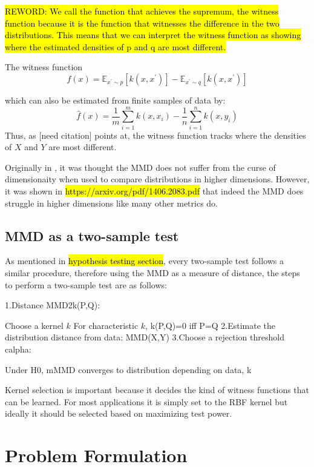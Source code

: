 \hl{REWORD: We call the function that achieves the supremum, the witness function because it is the function that witnesses the difference in the two distributions. This means that we can interpret the witness function as showing where the estimated densities of
p and q are most different.}

The witness function 
\begin{equation}
f(x)=\mathbb{E}_{x^{\prime} \sim p}\left[k\left(x, x^{\prime}\right)\right]-\mathbb{E}_{x^{\prime} \sim q}\left[k\left(x, x^{\prime}\right)\right]
\end{equation}

which can also be estimated from finite samples of data by:
\begin{equation}
\hat{f}(x)=\frac{1}{m} \sum_{i=1}^{m} k\left(x, x_{i}\right)-\frac{1}{n} \sum_{i=1}^{n} k\left(x, y_{i}\right)
\end{equation}
Thus, as [need citation] points at, the witness function tracks where the densities of $X$ and $Y$ are most different. 

Originally in \cite{gretton2012kernel}, it was thought the MMD does not suffer from the curse of dimensionaity when used to compare distributions in higher dimensions. However, it was shown in \hl{https://arxiv.org/pdf/1406.2083.pdf} that indeed the MMD does struggle in higher dimensions like many other metrics do.

\subsection{MMD as a two-sample test}
As mentioned in \hl{hypothesis testing section}, every two-sample test follows a similar procedure, therefore using the MMD as a measure of distance, the steps to perform a two-sample test  are as follows:

1.Distance MMD2k(P,Q):

Choose a kernel $k$
For characteristic $k$, k(P,Q)=0 iff P=Q
2.Estimate the distribution distance from data: MMD(X,Y)
3.Choose a rejection threshold calpha:

Under H0, mMMD converges to distribution depending on data, k

Kernel selection is important because it decides the kind of witness functions that can be learned. For most applications it is simply set to the RBF kernel but ideally it should be selected based on maximizing test power.

\section{Problem Formulation}

